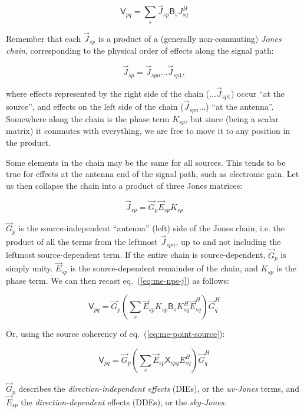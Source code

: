 \documentclass[]{aa}
\newcommand{\herm}{H}
\newcommand{\jones}[2]{\vec {#1}_{#2}}
\newcommand{\jonesT}[2]{\vec {#1}^{\herm}_{#2}}
\newcommand{\coh}[2]{\mathsf{{#1}}_{{#2}}}
\begin{document}
  \begin{equation}\label{eq:me-nps-j}
  \coh{V}{pq} = \sum_{s}{\jones{J}{sp} \coh{B}{s} J^\herm_{sq}}
  \end{equation}

Remember that each $\jones{J}{sp}$ is a product of a (generally non-commuting) {\em Jones chain}, corresponding to the physical order of effects along the signal path:

  \[
  \jones{J}{sp} = \jones{J}{spn} ... \jones{J}{sp1},
  \]

where effects represented by the right side of the chain ($...\jones{J}{sp1}$) occur ``at the source'', and effects on the left side of the chain ($\jones{J}{spn}...$) ``at the antenna''. Somewhere along the chain is the phase term $K_{sp}$, but since (being a scalar matrix) it commutes with everything, we are free to move it to any position in the product.

Some elements in the chain may be the same for all sources. This tends to be true for effects at the antenna end of the signal path, such as electronic gain. Let us then collapse the chain into a product of three Jones matrices:

  \[
  \jones{J}{sp} = \jones{G}{p} \jones{E}{sp} K_{sp}
  \]

$\jones{G}{p}$ is the source-independent ``antenna'' (left) side of the Jones chain, i.e. the product of all the terms from the leftmost $\jones{J}{spn}$, up to and not including the leftmost source-dependent term. If the entire chain is source-dependent, $\jones{G}{p}$ is simply unity. $\jones{E}{sp}$ is the source-dependent remainder of the chain, and $K_{sp}$ is the phase term. We can then recast eq.~(\ref{eq:me-nps-j}) as follows:

  \begin{equation}\label{eq:me-nps-gek}
  \coh{V}{pq} = \jones{G}{p} \left ( \sum_{s}{\jones{E}{sp} K_{sp} \coh{B}{s} K^\herm_{sq} \jonesT{E}{sq}} \right ) \jonesT{G}{q}
  \end{equation}

Or, using the source coherency of eq.~(\ref{eq:me-point-source}):

  \begin{equation}\label{eq:me-nps-ge}
  \coh{V}{pq} = \jones{G}{p} \left ( \sum_{s}{\jones{E}{sp} \coh{X}{spq} E^\herm_{sq}} \right ) \jonesT{G}{q}
  \end{equation}

$\jones{G}{p}$ describes the {\em direction-independent effects} (DIEs), or the \emph{uv-Jones} terms, and $\jones{E}{sp}$ the {\em  direction-dependent} effects (DDEs), or the \emph{sky-Jones}. 
\end{document}
